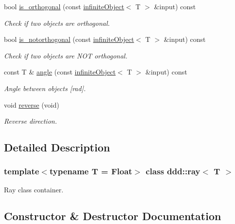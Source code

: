 \begin{DoxyCompactItemize}
bool \hyperlink{classddd_1_1infinite_object_a634f0db3a5447756901c43f8f3d20a8a}{is\+\_\+orthogonal} (const \hyperlink{classddd_1_1infinite_object}{infinite\+Object}$<$ T $>$ \&input) const
\begin{DoxyCompactList}\small\item\em Check if two objects are orthogonal. \end{DoxyCompactList}\item 
bool \hyperlink{classddd_1_1infinite_object_a1dbf3e37dc6f146f089c4c63c4704329}{is\+\_\+notorthogonal} (const \hyperlink{classddd_1_1infinite_object}{infinite\+Object}$<$ T $>$ \&input) const
\begin{DoxyCompactList}\small\item\em Check if two objects are N\+OT orthogonal. \end{DoxyCompactList}\item 
const T \& \hyperlink{classddd_1_1infinite_object_a2145eca21c4505c11d19badc25faaf85}{angle} (const \hyperlink{classddd_1_1infinite_object}{infinite\+Object}$<$ T $>$ \&input) const
\begin{DoxyCompactList}\small\item\em Angle between objects \mbox{[}rad\mbox{]}. \end{DoxyCompactList}\item 
\mbox{\label{classddd_1_1infinite_object_ae9f9826fd760a02b74604e63434b4211}} 
void \hyperlink{classddd_1_1infinite_object_ae9f9826fd760a02b74604e63434b4211}{reverse} (void)
\begin{DoxyCompactList}\small\item\em Reverse direction. \end{DoxyCompactList}\end{DoxyCompactItemize}


\subsection{Detailed Description}
\subsubsection*{template$<$typename T = Float$>$\newline
class ddd\+::ray$<$ T $>$}

Ray class container. 

\subsection{Constructor \& Destructor Documentation}
\mbox{\label{classddd_1_1ray_acac10719a90ebaa930a55f2aff5dd372}} 
